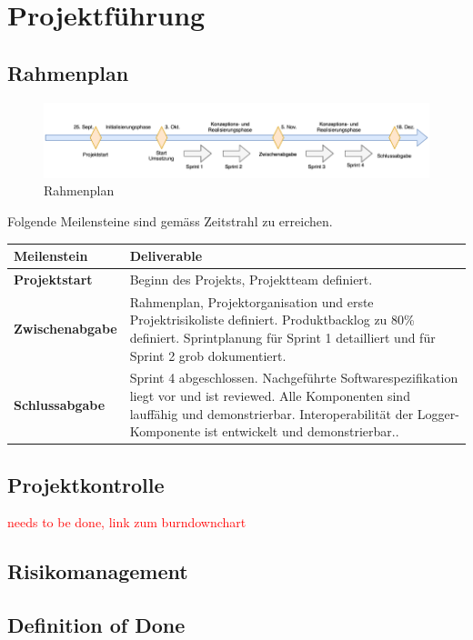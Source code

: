 \section{Projektführung}
\subsection{Rahmenplan}
\begin{figure}[H]
	\centering
	\includegraphics[width=\linewidth]{2_Projektfuehrung/Bilder/rahmenplan.png}
	\caption{Rahmenplan}
	\label{fig: Rahmenplan}
\end{figure}
Folgende Meilensteine sind gemäss Zeitstrahl zu erreichen.
\begin{center}
	\begin{tabularx}{\textwidth}{|X|X|}
		\hline
		\textbf{Meilenstein} & \textbf{Deliverable} \\
		\hline
		\textbf{Projektstart} & Beginn des Projekts, Projektteam definiert. \\
		\hline
		\textbf{Zwischenabgabe} & Rahmenplan, Projektorganisation und erste Projektrisikoliste definiert. Produktbacklog zu 80\% definiert. Sprintplanung für Sprint 1 detailliert und für Sprint 2 grob dokumentiert. \\
		\hline
		\textbf{Schlussabgabe} & Sprint 4 abgeschlossen. Nachgeführte Softwarespezifikation liegt vor und ist reviewed. Alle Komponenten sind lauffähig und demonstrierbar. Interoperabilität der Logger-Komponente ist entwickelt und demonstrierbar.. \\
		\hline
	\end{tabularx}
\end{center}
\subsection{Projektkontrolle}
\textcolor{red}{needs to be done, link zum burndownchart}
\subsection{Risikomanagement}
\subsection{Definition of Done}
